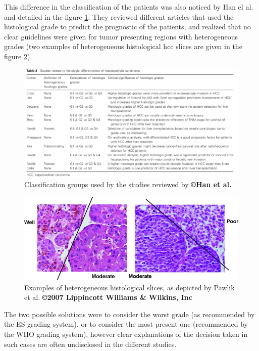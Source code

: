 This difference in the classification of the patients was also noticed
by Han el al. \cite{Han2013} and detailed in the figure \ref{fig:han2013_table3}. They reviewed different articles that used the histological grade to
predict the prognostic of the patients, and realized that no clear
guidelines were given for tumor presenting regions with heterogeneous
grades (two examples of heterogeneous histological \ac{hcc} slices are given in the figure \ref{fig:pawlik_fig4}).

\begin{figure}[th!]
\centering
\includegraphics[width=0.95\linewidth]{../HistologicalGradePrediction/images/image9}
\caption{Classification groups used by the studies reviewed by \textbf{©Han et al.} \cite{Han2013}}
\label{fig:han2013_table3}
\end{figure}


\begin{figure}[th!]
\centering
\includegraphics[width=0.7\linewidth]{../HistologicalGradePrediction/images/pawlik_fig4}
\caption{Examples of heterogeneous histological slices, as depicted by Pawlik et al. \cite{Pawlik2007} \textbf{©2007 Lippincott Williams \& Wilkins, Inc}}
\label{fig:pawlik_fig4}
\end{figure}


The two possible solutions were to consider the worst grade (as
recommended by the ES grading system), or to consider the most present
one (recommended by the WHO grading system), however clear explanations
of the decision taken in such cases are often undisclosed in the
different studies.


